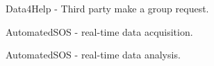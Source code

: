 \begin{figure}[ht]
    \caption{Data4Help - Third party make a group request.}
    \label{RV8}
\end{figure}

\begin{figure}[ht]
    \caption{AutomatedSOS - real-time data acquisition.}
    \label{RV9}
\end{figure}

\begin{figure}[ht]
    \caption{AutomatedSOS - real-time data analysis.}
    \label{RV10}
\end{figure}

